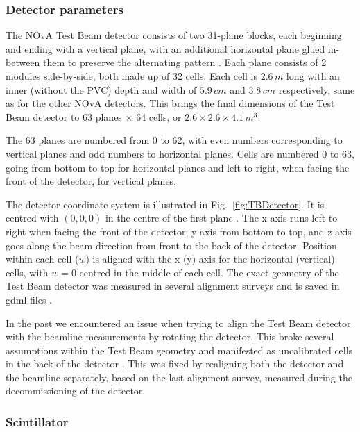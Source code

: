 \subsubsection*{Detector parameters}
The \gls{NOvA} Test Beam detector consists of two 31-plane blocks, each beginning and ending with a vertical plane, with an additional horizontal plane glued in-between them to preserve the alternating pattern \cite{NOvA-doc-29543}. Each plane consists of 2 modules side-by-side, both made up of 32 cells. Each cell is $2.6\,\unit{m}$ long with an inner (without the PVC) depth and width of $5.9\,\unit{cm}$ and $3.8\,\unit{cm}$ respectively, same as for the other \gls{NOvA} detectors. This brings the final dimensions of the Test Beam detector to 63 planes $\times$ 64 cells, or $2.6\times 2.6\times 4.1\,\unit{m^3}$.

The 63 planes are numbered from 0 to 62, with even numbers corresponding to vertical planes and odd numbers to horizontal planes. Cells are numbered 0 to 63, going from bottom to top for horizontal planes and left to right, when facing the front of the detector, for vertical planes.

The detector coordinate system is illustrated in Fig.~\ref{fig:TBDetector}. It is centred with $\left(0,0,0\right)$ in the centre of the first plane \cite{NOvA-doc-58388}. The x axis runs left to right when facing the front of the detector, y axis from bottom to top, and z axis goes along the beam direction from front to the back of the detector. Position within each cell ($w$) is aligned with the x (y) axis for the horizontal (vertical) cells, with $w=0$ centred in the middle of each cell. The exact geometry of the Test Beam detector was measured in several alignment surveys and is saved in gdml files \cite{NOvA-doc-57955}.

In the past we encountered an issue when trying to align the Test Beam detector with the beamline measurements by rotating the detector. This broke several assumptions within the Test Beam geometry \cite{NOvA-doc-58388} and manifested as uncalibrated cells in the back of the detector \cite{NOvA-doc-57516}. This was fixed by realigning both the detector and the beamline separately, based on the last alignment survey, measured during the decommissioning of the detector.


\subsubsection*{Scintillator}

